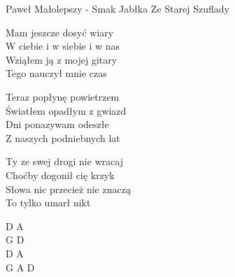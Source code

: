 {Paweł Małolepszy - Smak Jabłka}
{Ze Starej Szuflady}
\begin{text}
Mam jeszcze dosyć wiary\\ 
W ciebie i w siebie i w nas\\
Wziąłem ją z mojej gitary\\
Tego nauczył mnie czas

Teraz popłynę powietrzem\\
Światłem opadłym z gwiazd\\
Dni ponazywam odeszłe\\
Z naszych podniebnych lat

Ty ze swej drogi nie wracaj\\
Choćby dogonił cię krzyk\\
Słowa nic przecież nie znaczą\\
To tylko umarł nikt
\end{text}
\begin{chord}
D A\\
G D\\
D A\\
G A D
\end{chord}